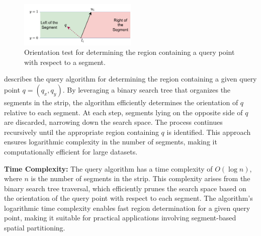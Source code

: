 \documentclass[12pt]{article}
\begin{document}
\begin{figure}[H]
    \centering
    \includegraphics[width=0.5\textwidth]{img/Segment_Location.png}
    \caption{Orientation test for determining the region containing a query point with respect to a segment.}
    \label{fig:query}
\end{figure}

 describes the query algorithm for determining the region containing a given query point \(q = (q_x, q_y)\). By leveraging a binary search tree that organizes the segments in the strip, the algorithm efficiently determines the orientation of \(q\) relative to each segment. At each step, segments lying on the opposite side of \(q\) are discarded, narrowing down the search space. The process continues recursively until the appropriate region containing \(q\) is identified. This approach ensures logarithmic complexity in the number of segments, making it computationally efficient for large datasets.

\textbf{Time Complexity:} The query algorithm has a time complexity of \(O(\log n)\), where \(n\) is the number of segments in the strip. This complexity arises from the binary search tree traversal, which efficiently prunes the search space based on the orientation of the query point with respect to each segment. The algorithm's logarithmic time complexity enables fast region determination for a given query point, making it suitable for practical applications involving segment-based spatial partitioning.
\end{document}

